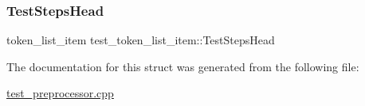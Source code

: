 \subsubsection{\texorpdfstring{Test\+Steps\+Head}{TestStepsHead}}
{\footnotesize\ttfamily token\+\_\+list\+\_\+item test\+\_\+token\+\_\+list\+\_\+item\+::\+Test\+Steps\+Head}



The documentation for this struct was generated from the following file\+:\begin{DoxyCompactItemize}
\item 
\hyperlink{test__preprocessor_8cpp}{test\+\_\+preprocessor.\+cpp}\end{DoxyCompactItemize}

